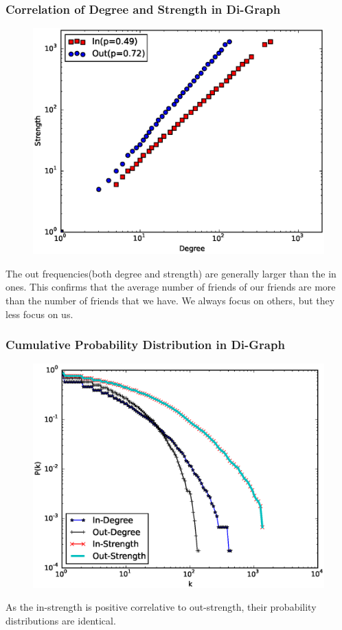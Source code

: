 \documentclass{beamer}
\begin{document}
\begin{frame}
\frametitle{Correlation of Degree and Strength in Di-Graph}
\begin{figure}
\includegraphics[width=0.65\linewidth]{de_st.eps}
\end{figure}
\small{The out frequencies(both degree and strength) are generally larger than the in ones. This confirms that the average number of friends of our friends are more than the number of friends that we have. We always focus on others, but they less focus on us.}
\end{frame}

\begin{frame}
\frametitle{Cumulative Probability Distribution in Di-Graph}
\begin{figure}
\includegraphics[width=.65\linewidth]{degree.eps}
\end{figure}
\small{As the in-strength is positive correlative to out-strength, their probability distributions are identical.}
\end{frame}
\end{document}

